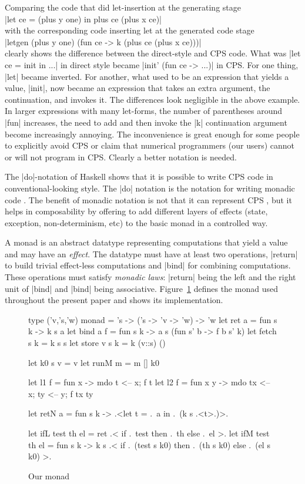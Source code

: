 \documentclass{llncs}
\begin{document}
\noindent Comparing the code that did let-insertion at the generating stage\\
|let ce = (plus y one) in  plus ce (plus x ce)|\\
with the corresponding code inserting let at the generated code stage\\
|letgen (plus y one) (fun ce -> k (plus ce (plus x ce)))|\\
clearly shows the difference between the direct-style and CPS code.
What was |let ce = init in ...| in direct style became
|init' (fun ce -> ...)| in CPS. For one thing, |let| became
inverted. For another, what used to be an expression that yields
a value, |init|, now became an expression that takes an extra argument,
the continuation, and invokes it. The differences look negligible in
the above example. In larger expressions with many let-forms, the
number of parentheses around |fun| increases, the need to add and
then invoke the |k| continuation argument become increasingly annoying. The
inconvenience is great enough for some people to explicitly avoid CPS
or claim that numerical programmers (our users) cannot or will not
program in CPS. Clearly a better notation is needed.

The |do|-notation of Haskell \cite{Haskell98Report} shows that it is possible
to write CPS code in conventional-looking style. The
|do| notation is the notation for writing monadic code \cite{moggi-notions}.
The benefit of monadic notation is not that it can represent CPS \cite{Filinski:Representing}, but it helps in composability by offering to add different
layers of effects (state, exception, non-determinism, etc) to the
basic monad \cite{liang-interpreter} in a controlled way.

A monad \cite{moggi-notions} is an abstract datatype representing
computations that yield a value and may have an \emph{effect}.
The datatype must have at least two operations, |return| to build
trivial effect-less computations and |bind| for combining
computations. These operations must satisfy \emph{monadic laws}:
|return| being the left and the right unit of |bind| and |bind| being
associative. Figure~\ref{ourmonad} defines the monad used throughout
the present paper and shows its implementation.

\begin{figure}\label{ourmonad}
\begin{code}
type ('v,'s,'w) monad = 's -> ('s -> 'v -> 'w) -> 'w
let ret a = fun s k -> k s a
let bind a f = fun s k -> a s (fun s' b -> f b s' k)
let fetch s k = k s s
let store v s k = k (v::s) ()

let k0 s v = v
let runM m = m [] k0

let l1 f = fun x -> mdo { t <-- x; f t}
let l2 f = fun x y -> mdo { tx <-- x; ty <-- y; f tx ty}

let retN a = fun s k -> .<let t = .~a in .~(k s .<t>.)>.

let ifL test th el = ret .< if .~test then .~th else .~el >.
let ifM test th el = fun s k ->
  k s .< if .~(test s k0) then .~(th s k0) else .~(el s k0) >.
\end{code}
\caption{Our monad}
\end{figure}
\end{document}

